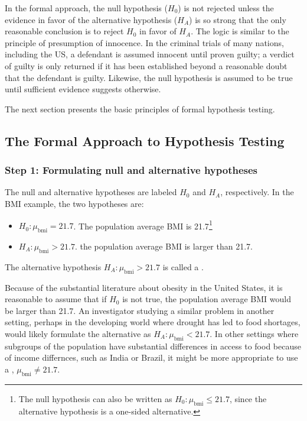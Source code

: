 \begin{spacing}{1.5}
In the formal approach, the null hypothesis ($H_0$) is not rejected unless the evidence in favor of the alternative hypothesis ($H_A$) is so strong that the only reasonable conclusion is to reject $H_0$ in favor of $H_A$. The logic is similar to the principle of presumption of innocence. In the criminal trials of many nations, including the US, a defendant is assumed innocent until proven guilty; a verdict of guilty is only returned if it has been established beyond a reasonable doubt that the defendant is guilty. Likewise, the null hypothesis is assumed to be true until sufficient evidence suggests otherwise. 

The next section presents the basic principles of formal hypothesis testing.

\subsection{The Formal Approach to Hypothesis Testing}
\label{formalHypothesisTesting}


\subsubsection{Step 1: Formulating null and alternative hypotheses}

The null and alternative hypotheses are labeled $H_0$ and $H_A$, respectively.  In the BMI example, the two hypotheses are:

\begin{itemize}
	\item $H_0: \mu_{\text{bmi}} = 21.7$. The population average BMI is 21.7\footnote{The null hypothesis can also be written as $H_0: \mu_{\text{bmi}} \leq 21.7$, since the alternative hypothesis is a one-sided alternative.}
	
	\item $H_A: \mu_{\text{bmi}} > 21.7$. the population average BMI is larger than 21.7.
	
\end{itemize}	
	
The alternative hypothesis $H_A: \mu_{\text{bmi}} > 21.7$ is called a . 

Because of the substantial literature about obesity in the United States, it is reasonable to assume that if $H_0$ is not true, the population average BMI would be larger than 21.7.  An investigator studying a similar problem in another setting, perhaps in the developing world where drought has led to food shortages, would likely formulate the alternative as $ H_A:\mu_{\text{bmi}} < 21.7$. In other settings where subgroups of the population have  substantial differences in access to food because of income differnces, such as India or Brazil, it might be more appropriate to use a , $\mu_{\text{bmi}} \neq 21.7$. 



\end{spacing}
